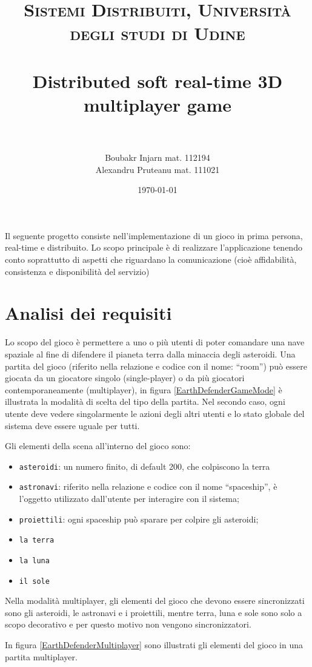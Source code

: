 \documentclass[paper=a4, fontsize=11pt]{scrartcl} %
\title{	
\normalfont \normalsize 
\textsc{Sistemi Distribuiti, Università degli studi di Udine} \\ [25pt] %
\horrule{0.5pt} \\[0.4cm] %
\huge Distributed soft real-time 3D multiplayer game\\%
\horrule{2pt} \\[0.5cm] %
}
\author{Boubakr Injarn mat. 112194\\Alexandru Pruteanu mat. 111021} %
\date{\normalsize\today} %
\numberwithin{equation}{section} %
\numberwithin{figure}{section} %
\numberwithin{table}{section} %
\begin{document}
\maketitle %
\newpage
\tableofcontents
\listoffigures
\newpage
\textbf{\abstractname}

Il seguente progetto consiste nell'implementazione di un gioco in prima persona,
real-time e distribuito. Lo scopo principale è di realizzare l'applicazione tenendo
conto soprattutto di aspetti che riguardano la comunicazione
(cioè affidabilità, consistenza e disponibilità del servizio)

\section{Analisi dei requisiti}
Lo scopo del gioco è permettere a uno o più utenti di poter comandare una nave spaziale al fine di difendere il pianeta terra dalla minaccia degli asteroidi.
Una partita del gioco (riferito nella relazione e codice con il nome: ``room'') può essere giocata da un giocatore singolo (single-player) o da più
giocatori contemporaneamente (multiplayer), in figura \ref{EarthDefenderGameMode} è illustrata la modalità di scelta del tipo della partita.
Nel secondo caso, ogni utente deve vedere singolarmente le azioni degli altri utenti e lo stato globale del sistema deve essere uguale per tutti.

Gli elementi della scena all'interno del gioco sono:
\begin{itemize}
\item \texttt{asteroidi}: un numero finito, di default 200, che colpiscono la terra
\item \texttt{astronavi}: riferito nella relazione e codice con il nome ``spaceship'', è l'oggetto utilizzato dall'utente per interagire con il sistema;
\item \texttt{proiettili}: ogni spaceship può sparare per colpire gli asteroidi;
\item \texttt{la terra}
\item \texttt{la luna}
\item \texttt{il sole}
\end{itemize}

Nella modalità multiplayer, gli elementi del gioco che devono essere sincronizzati sono gli asteroidi, le astronavi e i proiettili, mentre terra, luna e sole sono solo a scopo decorativo e per questo motivo non vengono sincronizzatori.

In figura \ref{EarthDefenderMultiplayer} sono illustrati gli elementi del gioco in una partita multiplayer.
\end{document}
